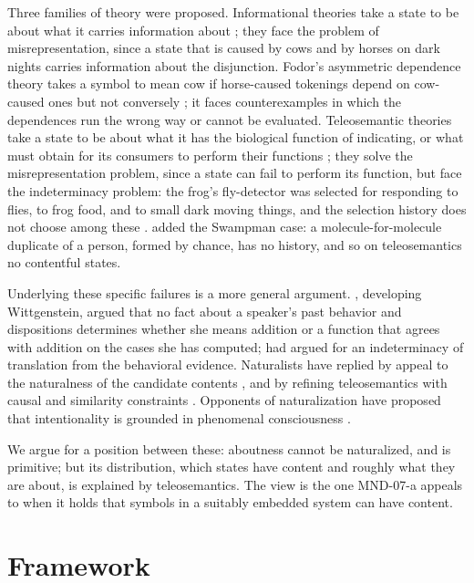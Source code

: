 \documentclass{situationist-preprint}
\begin{document}
Three families of theory were proposed. Informational theories take a state to be about what it carries information about \citep{Dretske1981}; they face the problem of misrepresentation, since a state that is caused by cows and by horses on dark nights carries information about the disjunction. Fodor's asymmetric dependence theory takes a symbol to mean cow if horse-caused tokenings depend on cow-caused ones but not conversely \citep{Fodor1990}; it faces counterexamples in which the dependences run the wrong way or cannot be evaluated. Teleosemantic theories take a state to be about what it has the biological function of indicating, or what must obtain for its consumers to perform their functions \citep{Millikan1984,Millikan1989,Papineau1987}; they solve the misrepresentation problem, since a state can fail to perform its function, but face the indeterminacy problem: the frog's fly-detector was selected for responding to flies, to frog food, and to small dark moving things, and the selection history does not choose among these \citep{Neander2017}. \citet{Davidson1987} added the Swampman case: a molecule-for-molecule duplicate of a person, formed by chance, has no history, and so on teleosemantics no contentful states.

Underlying these specific failures is a more general argument. \citet{Kripke1982}, developing Wittgenstein, argued that no fact about a speaker's past behavior and dispositions determines whether she means addition or a function that agrees with addition on the cases she has computed; \citet{Quine1960} had argued for an indeterminacy of translation from the behavioral evidence. Naturalists have replied by appeal to the naturalness of the candidate contents \citep{Lewis1983}, and by refining teleosemantics with causal and similarity constraints \citep{Neander2017,Shea2018}. Opponents of naturalization have proposed that intentionality is grounded in phenomenal consciousness \citep{Mendelovici2018}.

We argue for a position between these: aboutness cannot be naturalized, and is primitive; but its distribution, which states have content and roughly what they are about, is explained by teleosemantics. The view is the one MND-07-a appeals to when it holds that symbols in a suitably embedded system can have content.

\section{Framework}
\end{document}
